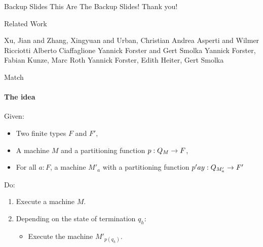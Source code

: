\appendix %


\begin{frame}{Backup Slides}
  This Are The Backup Slides!
  \vfill
  Thank you!
\end{frame}

\begin{frame}{Related Work}
  \footnotesize
  \begin{thebibliography}{10}
    \beamertemplatearticlebibitems%
    \bibitem{}
    Xu, Jian and Zhang, Xingyuan and Urban, Christian
    \bibitem{}
    Andrea Asperti and Wilmer Ricciotti
    \bibitem{}
    Alberto Ciaffaglione
    \bibitem{}
    Yannick Forster and Gert Smolka
    \bibitem{}
    Yannick Forster, Fabian Kunze, Marc Roth
    \bibitem{}
    Yannick Forster, Edith Heiter, Gert Smolka
  \end{thebibliography}
\end{frame}

\begin{frame}{Match}
  \framesubtitle{The idea}
  Given:
  \begin{itemize}
    \item Two finite types $F$ and $F'$,
    \item A machine $M$ and a partitioning function $p : Q_M \rightarrow F$,
    \item For all $a:F$, a machine $M'_a$ with a partitioning function $p'ay : Q_{M'_a} \rightarrow F'$
  \end{itemize}
  Do:
  \begin{enumerate}
    \item Execute a machine $M$.
    \item Depending on the state of termination $q_h$:
      \begin{itemize}
        \item Execute the machine $M'_{p(q_h)}$.
      \end{itemize}
  \end{enumerate}
\end{frame}

